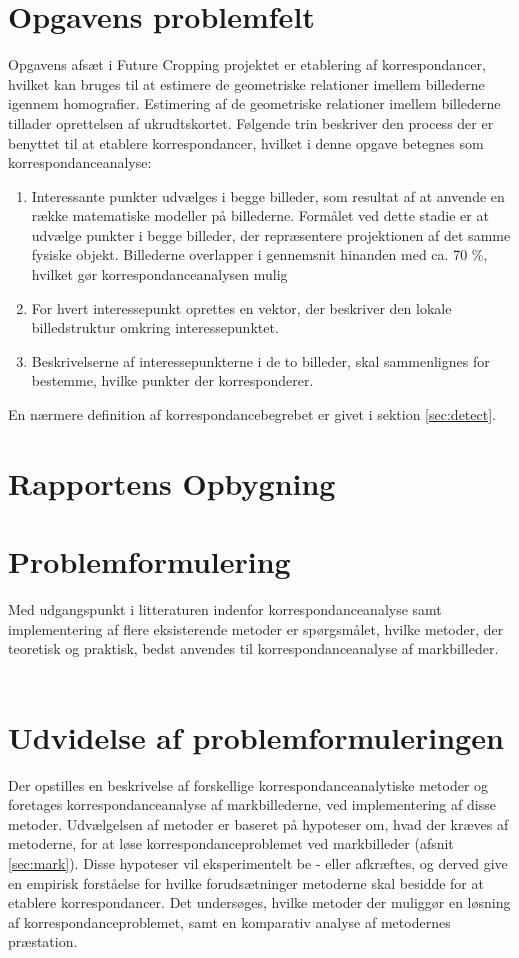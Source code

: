 \section{Opgavens problemfelt} \label{subsec:felt}
Opgavens afsæt i Future Cropping projektet er etablering  af korrespondancer, hvilket kan bruges til at estimere de geometriske relationer imellem billederne igennem homografier. Estimering af de geometriske relationer imellem billederne tillader oprettelsen af ukrudtskortet. Følgende trin beskriver den process der er benyttet til at etablere korrespondancer, hvilket i denne opgave betegnes som korrespondanceanalyse:
\begin{enumerate}
\item{Interessante punkter udvælges i begge billeder, som resultat af at anvende en række matematiske modeller på billederne. Formålet ved dette stadie er at udvælge  punkter i begge billeder, der repræsentere projektionen af det samme fysiske objekt. Billederne overlapper i gennemsnit hinanden med ca. 70 \%, hvilket gør korrespondanceanalysen mulig}
\item{For hvert interessepunkt oprettes en vektor, der beskriver den lokale billedstruktur omkring interessepunktet.}
\item{Beskrivelserne af interessepunkterne i de to billeder, skal sammenlignes for bestemme, hvilke punkter der korresponderer.}
\end{enumerate}
En nærmere definition af korrespondancebegrebet er givet i sektion \ref{sec:detect}.
\section{Rapportens Opbygning}
\section{Problemformulering} \label{subsec:form}
Med udgangspunkt i litteraturen indenfor
korrespondanceanalyse samt implementering af
flere eksisterende metoder er spørgsmålet, hvilke metoder, der teoretisk og praktisk, bedst anvendes til korrespondanceanalyse af markbilleder. \\ \\
\section{Udvidelse af problemformuleringen}
Der opstilles en beskrivelse af forskellige korrespondanceanalytiske metoder og foretages korrespondanceanalyse af markbillederne, ved implementering af disse metoder. Udvælgelsen af metoder er baseret på hypoteser om, hvad der kræves af metoderne, for at løse korrespondanceproblemet ved markbilleder (afsnit \ref{sec:mark}). Disse hypoteser vil eksperimentelt be - eller afkræftes, og derved give en empirisk forståelse for hvilke forudsætninger metoderne skal besidde for at etablere korrespondancer. 
Det undersøges, hvilke metoder der muliggør en løsning af korrespondanceproblemet, samt en komparativ analyse af metodernes præstation.
